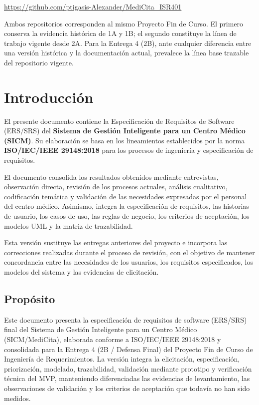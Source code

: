\documentclass[11pt,a4paper]{article}
\begin{document}
	\begin{center}
		\url{https://github.com/ptigasis-Alexander/MediCita_ISR401}
	\end{center}
	
	Ambos repositorios corresponden al mismo Proyecto Fin de Curso. El primero conserva la evidencia histórica de 1A y 1B; el segundo constituye la línea de trabajo vigente desde 2A. Para la Entrega 4 (2B), ante cualquier diferencia entre una versión histórica y la documentación actual, prevalece la línea base trazable del repositorio vigente.
	
	
	\section{ Introducción}
	
	El presente documento contiene la Especificación de Requisitos de Software
	(ERS/SRS) del \textbf{Sistema de Gestión Inteligente para un Centro Médico
		(SICM)}. Su elaboración se basa en los lineamientos establecidos por la norma
	\textbf{ISO/IEC/IEEE 29148:2018} para los procesos de ingeniería y
	especificación de requisitos.
	
	El documento consolida los resultados obtenidos mediante entrevistas,
	observación directa, revisión de los procesos actuales, análisis cualitativo,
	codificación temática y validación de las necesidades expresadas por el
	personal del centro médico. Asimismo, integra la especificación de requisitos,
	las historias de usuario, los casos de uso, las reglas de negocio, los criterios
	de aceptación, los modelos UML y la matriz de trazabilidad.
	
	Esta versión sustituye las entregas anteriores del proyecto e incorpora las
	correcciones realizadas durante el proceso de revisión, con el objetivo de
	mantener concordancia entre las necesidades de los usuarios, los requisitos
	especificados, los modelos del sistema y las evidencias de elicitación.
	
	\subsection{ Propósito}
	
	Este documento presenta la especificación de requisitos de software (ERS/SRS) final del Sistema de Gestión Inteligente para un Centro Médico (SICM/MediCita), elaborada conforme a ISO/IEC/IEEE 29148:2018 y consolidada para la Entrega 4 (2B / Defensa Final) del Proyecto Fin de Curso de Ingeniería de Requerimientos. La versión integra la elicitación, especificación, priorización, modelado, trazabilidad, validación mediante prototipo y verificación técnica del MVP, manteniendo diferenciadas las evidencias de levantamiento, las observaciones de validación y los criterios de aceptación que todavía no han sido medidos.
	
\end{document}

